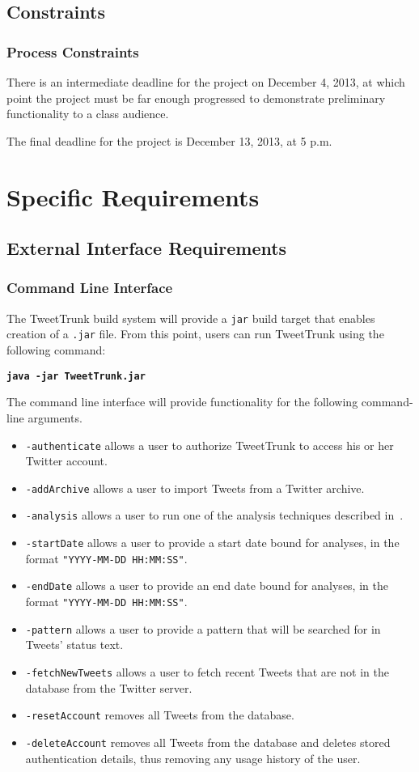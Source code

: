 \documentclass[a4paper, 12pt]{article}
\begin{document}
\subsection{Constraints}
\subsubsection{Process Constraints}
There is an intermediate deadline for the project on December 4, 2013, at which point the project must be far enough progressed to demonstrate preliminary functionality to a class audience.

The final deadline for the project is December 13, 2013, at 5 p.m.

\section{Specific Requirements}
\subsection{External Interface Requirements}
\subsubsection{Command Line Interface}
\label{sec:CLI}
The TweetTrunk build system will provide a \texttt{jar} build target that enables creation of a \texttt{.jar} file. From this point, users can run TweetTrunk using the following command:

\begin{center}\texttt{\textbf{java -jar TweetTrunk.jar}}\end{center}

The command line interface will provide functionality for the following command-line arguments.
\begin{itemize}
\item \texttt{-authenticate} allows a user to authorize TweetTrunk to access his or her Twitter account.
\item \texttt{-addArchive} allows a user to import Tweets from a Twitter archive.
\item \texttt{-analysis} allows a user to run one of the analysis techniques described in~.
\item \texttt{-startDate} allows a user to provide a start date bound for analyses, in the format \texttt{"YYYY-MM-DD HH:MM:SS"}.
\item \texttt{-endDate} allows a user to provide an end date bound for analyses, in the format \texttt{"YYYY-MM-DD HH:MM:SS"}.
\item \texttt{-pattern} allows a user to provide a pattern that will be searched for in Tweets' status text.
\item \texttt{-fetchNewTweets} allows a user to fetch recent Tweets that are not in the database from the Twitter server.
\item \texttt{-resetAccount} removes all Tweets from the database.
\item \texttt{-deleteAccount} removes all Tweets from the database and deletes stored authentication details, thus removing any usage history of the user.
\end{itemize}
\end{document}
